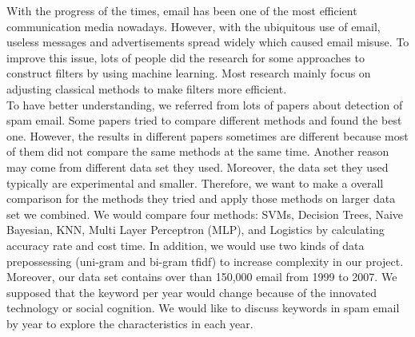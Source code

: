 
With the progress of the times, email has been one of the most efficient communication media nowadays. However, with the ubiquitous use of email, useless messages and advertisements spread widely which caused email misuse. To improve this issue, lots of people did the research for some approaches to construct filters by using machine learning. Most research mainly focus on adjusting classical methods to make filters more efficient.\\

To have better understanding, we referred from lots of papers about detection of spam email. Some papers tried to compare different methods and found the best one. However, the results in different papers sometimes are different because most of them did not compare the same methods at the same time. Another reason may come from different data set they used. Moreover, the data set they used typically are experimental and smaller. Therefore, we want to make a overall comparison for the methods they tried and apply those methods on larger data set we combined. We would compare four methods: SVMs, Decision Trees, Naive Bayesian, KNN, Multi Layer Perceptron (MLP), and Logistics by calculating accuracy rate and cost time. In addition, we would use two kinds of data prepossessing (uni-gram and bi-gram tfidf) to increase complexity in our project.\\

Moreover, our data set contains over than 150,000 email from 1999 to 2007. We supposed that the keyword per year would change because of the innovated technology or social cognition. We would like to discuss keywords in spam email by year to explore the characteristics in each year.\\


